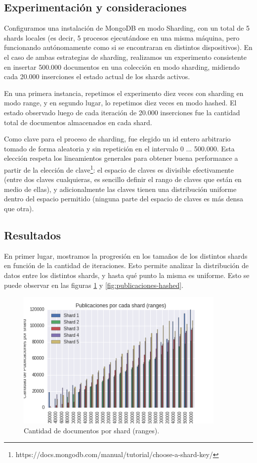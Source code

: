 \subsection{Experimentación y consideraciones}

Configuramos una instalación de MongoDB en modo Sharding, con un total de 5 shards locales (es decir, 5 procesos ejecutándose en una misma máquina, pero funcionando autónomamente como si se encontraran en distintos dispositivos). En el caso de ambas estrategias de sharding, realizamos un experimento consistente en insertar 500.000 documentos en una colección en modo sharding, midiendo cada 20.000 inserciones el estado actual de los shards activos.

En una primera instancia, repetimos el experimento diez veces con sharding en modo range, y en segundo lugar, lo repetimos diez veces en modo hashed. El estado observado luego de cada iteración de 20.000 inserciones fue la cantidad total de documentos almacenados en cada shard.

Como clave para el proceso de sharding, fue elegido un id entero arbitrario tomado de forma aleatoria y sin repetición en el intervalo 0 ... 500.000. Esta elección respeta los lineamientos generales para obtener buena performance a partir de la elección de clave\footnote{https://docs.mongodb.com/manual/tutorial/choose-a-shard-key/}: el espacio de claves es divisible efectivamente (entre dos claves cualquieras, es sencillo definir el rango de claves que están en medio de ellas), y adicionalmente las claves tienen una distribución uniforme dentro del espacio permitido (ninguna parte del espacio de claves es más densa que otra).

\subsection{Resultados}

En primer lugar, mostramos la progresión en los tamaños de los distintos shards en función de la cantidad de iteraciones. Esto permite analizar la distribución de datos entre los distintos shards, y hasta qué punto la misma es uniforme. Esto se puede observar en las figuras \ref{fig:publicaciones-ranges} y \ref{fig:publicaciones-hashed}.

\begin{figure}[h!]
  \centering
  \includegraphics[width=4in]{imagenes/publicaciones_by_shard_ranges.png}
  \caption{Cantidad de documentos por shard (ranges).}
  \label{fig:publicaciones-ranges}
\end{figure}

